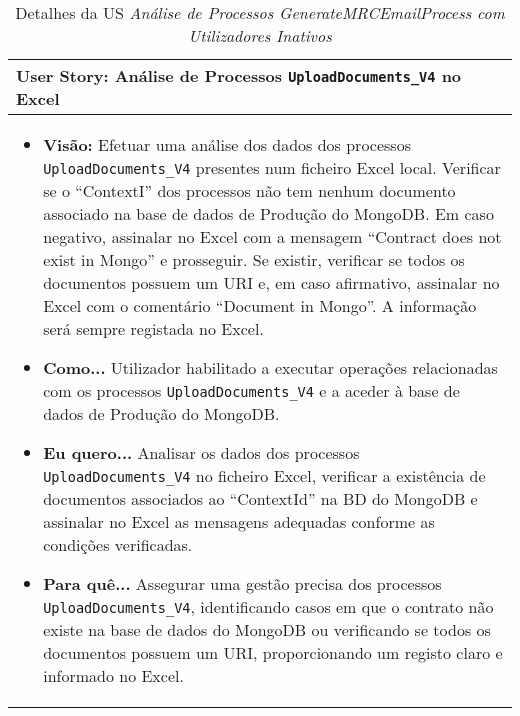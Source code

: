                 \begin{table}[htbp] %
                    \centering
                    \caption{Detalhes da US \textit{Análise de Processos GenerateMRCEmailProcess com Utilizadores Inativos}}\label{table:python_us3}
                    \begin{tabularx}{1\textwidth}{|>{\raggedright\arraybackslash}X|}
                        \hline
                        \rowcolor{lightgray}
                        \textbf{User Story:} Análise de Processos \texttt{UploadDocuments\_V4} no Excel \\
                        \hline
                        \rowcolor{lightgray!20}
                                        
                        \begin{itemize}
                            \item \textbf{Visão:} Efetuar uma análise dos dados dos processos \texttt{UploadDocuments\_V4} presentes num ficheiro Excel local. Verificar se o ``ContextI'' dos processos não tem nenhum documento associado na base de dados de Produção do MongoDB. Em caso negativo, assinalar no Excel com a mensagem ``Contract does not exist in Mongo'' e prosseguir. Se existir, verificar se todos os documentos possuem um URI e, em caso afirmativo, assinalar no Excel com o comentário ``Document in Mongo''. A informação será sempre registada no Excel.

                            \item \textbf{Como...} Utilizador habilitado a executar operações relacionadas com os processos \texttt{UploadDocuments\_V4} e a aceder à base de dados de Produção do MongoDB.

                            \item \textbf{Eu quero...} Analisar os dados dos processos \texttt{UploadDocuments\_V4} no ficheiro Excel, verificar a existência de documentos associados ao ``ContextId'' na BD do MongoDB e assinalar no Excel as mensagens adequadas conforme as condições verificadas.

                            \item \textbf{Para quê...} Assegurar uma gestão precisa dos processos \texttt{UploadDocuments\_V4}, identificando casos em que o contrato não existe na base de dados do MongoDB ou verificando se todos os documentos possuem um URI, proporcionando um registo claro e informado no Excel.
                        \end{itemize}
                        \\
                        \hline
                    \end{tabularx}
                \end{table}


